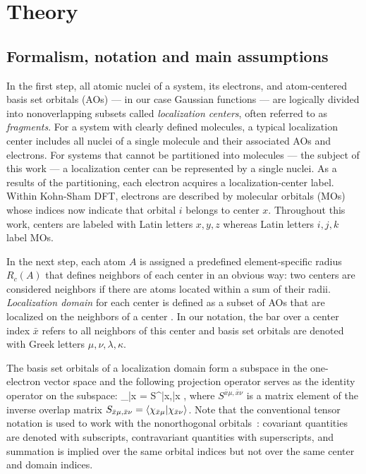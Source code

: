 \documentclass[aps,prl,twocolumn,reprint,amsmath,amssymb]{revtex4-1}
\begin{document}
\section{Theory} 

\subsection{Formalism, notation and main assumptions}
 
In the first step, all atomic nuclei of a system, its electrons, and atom-centered basis set orbitals (AOs) --- in our case Gaussian functions --- are logically divided into nonoverlapping subsets called \emph{localization centers}, often referred to as \emph{fragments}. 
For a system with clearly defined molecules, a typical localization center includes all nuclei of a single molecule and their associated AOs and electrons. 
For systems that cannot be partitioned into molecules --- the subject of this work --- a localization center can be represented by a single nuclei. 
As a results of the partitioning, each electron acquires a localization-center label. 
Within Kohn-Sham DFT, electrons are described by molecular orbitals (MOs)  whose indices now indicate that orbital $i$ belongs to center $x$. Throughout this work, centers are labeled with Latin letters $x,y,z$ whereas Latin letters $i,j,k$ label MOs. 

In the next step, each atom $A$ is assigned a predefined element-specific radius $R_c(A)$ that defines neighbors of each center in an obvious way: two centers are considered neighbors if there are atoms located within a sum of their radii. 
\emph{Localization domain} for each center is defined as a subset of AOs that are localized on the neighbors of a center . In our notation, the bar over a center index $\bar{x}$ refers to all neighbors of this center and basis set orbitals are denoted with Greek letters $\mu,\nu,\lambda, \kappa$. 

The basis set orbitals of a localization domain form a subspace in the one-electron vector space and the following projection operator serves as the identity operator on the subspace:
%
\bea
{}_{\bar{x}} =  S^{\bar{x}\mu,\bar{x}\nu} ,
\eea
%
where $S^{\bar{x}\mu,\bar{x}\nu}$ is a matrix element of the inverse overlap matrix $S_{\bar{x}\mu,\bar{x}\nu} = \langle  \chi_{\bar{x}\mu} \vert  \chi_{\bar{x}\nu} \rangle $. Note that the conventional tensor notation is used to work with the nonorthogonal orbitals~\cite{head1998tensor}: covariant quantities are denoted with subscripts, contravariant quantities with superscripts, and summation is implied over the same orbital indices but not over the same center and domain indices.
\end{document}
